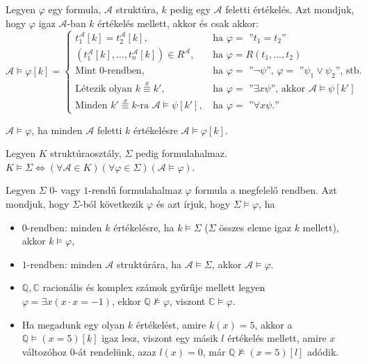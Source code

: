 \begin{defi} Legyen $\varphi$ egy formula, $\mathcal{A}$ struktúra, $k$ pedig egy $\mathcal{A}$ feletti értékelés. Azt mondjuk, hogy $\varphi$ igaz $\mathcal{A}$-ban $k$ értékelés mellett, akkor és csak akkor:
$$
\mathcal{A} \models \varphi[k] = 
\begin{cases}
t^{\mathcal{A}}_1[k] = t^{\mathcal{A}}_2[k], & \text{ ha $\varphi =$ ''$t_1 = t_2$''} \\
(t^\mathcal{A}_1[k], \ldots, t^{\mathcal{A}}_n[k]) \in R^{\mathcal{A}}, & \text{ ha $\varphi = R(t_1, \ldots, t_2)$} \\
\text{Mint $0$-rendben,} & \text{ ha $\varphi =$ ''$\lnot \psi$'', $\varphi =$ ''$\psi_1 \lor \psi_2$'', stb.} \\
\text{Létezik olyan $k \stackrel{x}{\equiv} k'$,}& \text{ ha $\varphi =$ ''$\exists x \psi$'', akkor $\mathcal{A} \models \psi[k']$ } \\
\text{Minden $k' \stackrel{x}{\equiv} k$-ra $\mathcal{A} \models \psi[k']$,} & \text{ ha $\varphi =$ ''$\forall x \psi.$''}
\end{cases}
$$
\end{defi}
\begin{defi}
$\mathcal{A} \models \varphi$, ha minden $\mathcal{A}$ feletti $k$ értékelésre $\mathcal{A} \models \varphi[k]$.
\end{defi}
\begin{defi} Legyen $K$ struktúraosztály, $\Sigma$ pedig formulahalmaz. $K \models \Sigma \Leftrightarrow (\forall \mathcal{A} \in K)(\forall \varphi \in \Sigma)(\mathcal{A} \models \varphi)$.
\end{defi}
\begin{defi} Legyen $\Sigma$ $0$- vagy $1$-rendű formulahalmaz $\varphi$ formula a megfelelő rendben. Azt mondjuk, hogy $\Sigma$-ból következik $\varphi$ és azt írjuk, hogy $\Sigma \models \varphi$, ha
\begin{itemize}
\item $0$-rendben: minden $k$ értékelésre, ha $k \models \Sigma$ ($\Sigma$ összes eleme igaz $k$ mellett), akkor $k \models \varphi$,
\item $1$-rendben: minden $\mathcal{A}$ struktúrára, ha $\mathcal{A} \models \Sigma$, akkor $\mathcal{A} \models \varphi$.
\end{itemize}
\end{defi}
\begin{exmpl} 
\begin{itemize}
\item $\mathbb{Q}, \mathbb{C}$ racionális és komplex számok gyűrűje mellett legyen $\varphi = \exists x(x\cdot x = -1)$, ekkor $\mathbb{Q} \not\models \varphi$, viszont $\mathbb{C} \models \varphi$.
\item Ha megadunk egy olyan $k$ értékelést, amire $k(x)=5$, akkor a $\mathbb{Q} \models (x = 5)[k]$ igaz lesz, viszont egy másik $l$ értékelés mellett, amire $x$ változóhoz $0$-át rendelünk, azaz $l(x)=0$, már $\mathbb{Q} \not\models (x = 5)[l]$ adódik.
\end{itemize}
\end{exmpl}